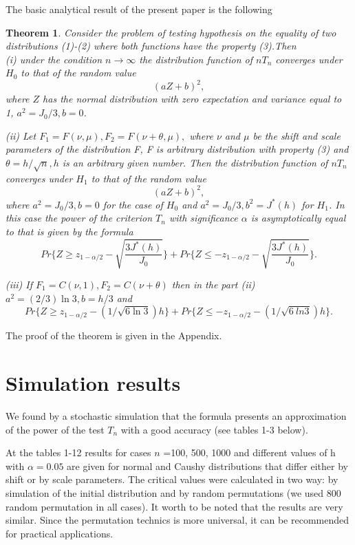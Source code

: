 \documentclass[final,11pt,3p]{elsarticle}
\newtheorem{theorem}{Theorem}
\begin{document}
The basic analytical result of the present paper is the following
\begin{theorem} Consider the problem of testing hypothesis on the equality of two distributions (1)-(2) where both functions have the property (3).Then\\
(i) under the condition $n \to \infty$
the distribution function of $nT_n$  converges under $H_0$ to that of the random value
\begin{equation}\label{Distr}
(aZ + b)^2,
\end{equation}
where  $Z$ has the normal distribution with zero expectation and variance equal to 1, $a^2= J_0/3, b=0$.

(ii)
Let $F_1= F(\nu,\mu),F_2=F(\nu+\theta,\mu),$
where $\nu$  and $\mu$ be the shift and scale parameters of the distribution F, F is arbitrary distribution with property   (3) and
$\theta=h/\sqrt{n},h$ is an arbitrary given number. Then
the distribution function of $nT_n$  converges under $H_1$ to that of the random value
$$
(aZ + b)^2,
$$
where $a^2 = J_0/3, b=0$
for the case of $H_0$ and
$a^2= J_0/3, b^2 = J^*(h)$
for  $H_1$.
In this case the power of the criterion $T_n$ with significance $\alpha$ is asymptotically equal to that is given by the formula
$$
Pr\{Z\geq z_{1-\alpha/2}-\sqrt{\frac {3J^*(h)}{J_0}}\}
+ Pr\{Z\leq - z_{1-\alpha/2}-\sqrt{\frac {3J^*(h)}{J_0}}\}.
$$

(iii) If $F_1=C(\nu,1), F_2=C(\nu + \theta)$ then in the part (ii)
$a^2 =(2/3)\ln 3, b= h/3$ and
$$
Pr\{Z\geq z_{1-\alpha/2}-(1/\sqrt{6\ln 3})h\}
+ Pr\{Z\leq - z_{1-\alpha/2}-(1/\sqrt{6\
ln 3})h\}.
$$
\end{theorem}


The proof of the theorem is given in the Appendix.


\section{Simulation results}


 We found by a stochastic simulation that the formula presents an approximation of the power of the test $T_n$ with a good accuracy (see tables 1-3 below).

 At the tables 1-12 results for cases $n$ =100, 500, 1000 and different values of h with $\alpha=0.05$ are given for normal and Caushy distributions that differ either by shift or by scale parameters. The critical values were calculated in two way: by simulation of the initial distribution and by random permutations (we used 800 random permutation in all cases). It worth to be noted that the results are very similar. Since the permutation technics is more universal, it can be recommended for practical applications.
\end{document}
